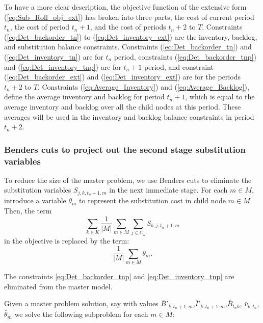 \documentclass[10pt]{article}
\newcommand{\ti}{t} %
\newcommand{\TI}{T}
\newcommand{\ka}{k} %
\begin{document}
 To have a more clear description, the objective function of the extensive form (\ref{eq:Sub_Roll_obj_ext}) has broken into three parts, the cost of current period $\ti_n$, the cost of period $\ti_n+1$, and the cost of periods $t_n+2$ to $\TI$. Constraints (\ref{eq:Det_backorder_tn}) to (\ref{eq:Det_inventory_ext}) are the inventory, backlog, and substitution balance constraints. Constraints (\ref{eq:Det_backorder_tn}) and (\ref{eq:Det_inventory_tn}) are for $\ti_n$ period, constraints (\ref{eq:Det_backorder_tnp}) and (\ref{eq:Det_inventory_tnp}) are for $\ti_n+1$ period, and constraint (\ref{eq:Det_backorder_ext}) and (\ref{eq:Det_inventory_ext}) are for the periods $\ti_n+2$ to $\TI$. Constraints (\ref{eq:Average_Inventory}) and (\ref{eq:Average_Backlog}), define the average inventory and backlog for period $\ti_n+1$, which is equal to the average inventory and backlog over all the child nodes at this period. These averages will be used in the inventory and backlog balance constraints in period $\ti_n+2$.
 
  \subsubsection{Benders cuts to project out the second stage substitution variables}
  
 To reduce the size of the master problem, we use Benders cuts to eliminate the substitution variables $S_{j,k,t_n+1,m}$ in the next immediate stage. For each $m \in M$, introduce a variable $\theta_m$ to represent the substitution cost in child node $m \in M$. Then, the term 
 \[ \sum_{k \in K} \frac{1}{|M|} \sum_{m \in M} \sum_{j \in C_k} S_{k,j,t_n+1,m} \]
 in the objective is replaced by the term:
 \[ \frac{1}{|M|} \sum_{m \in M} \theta_m. \]

The constraints \eqref{eq:Det_backorder_tnp} and \eqref{eq:Det_inventory_tnp} are eliminated from the master model. 

Given a master problem solution, say with values $\overline{B}'_{k,t_n+1,m}$,$\bar{I}'_{k,t_n+1,m}$,$\bar{B}_{ t_n \ka}$, $\bar{v}_{k,t_n}$, $\bar{\theta}_m$ we solve the following subproblem for each $m \in M$:



    
\end{document}
